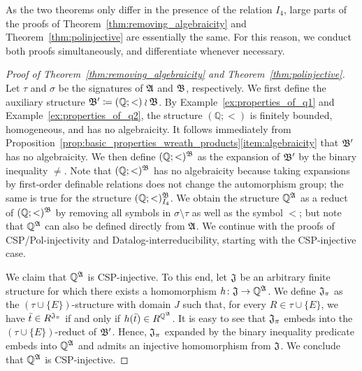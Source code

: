 \medskip 
 
As the two theorems only differ in the presence of the relation $I_4$, 
large parts of the proofs of Theorem~\ref{thm:removing_algebraicity} and Theorem~\ref{thm:polinjective} are essentially the same.
%
For this reason, we conduct both proofs simultaneously, and differentiate whenever necessary. 

\begin{proof}[Proof of Theorem~\ref{thm:removing_algebraicity} and Theorem~\ref{thm:polinjective}]     

Let $\tau$ and $\sigma$ be the signatures of $\mathfrak{A}$ and $\mathfrak{B}$, respectively.
%
We first define the auxiliary structure $\mathfrak{B}'\mathrel{\mathop:}\mathrel{\mkern-1.2mu}=  (\mathbb{Q};<) \wr \mathfrak{B}$. 
%
By Example~\ref{ex:properties_of_q1} and Example~\ref{ex:properties_of_q2}, the structure $(\mathbb{Q};<)$ is finitely bounded, homogeneous, and has no algebraicity.
%
It follows immediately from Proposition~\ref{prop:basic_properties_wreath_products}\eqref{item:algebraicity}  that $\mathfrak{B}'$ has no algebraicity.
% 
We then define $(\mathbb{Q};<)^{\mathfrak{B}}$ as the expansion of $\mathfrak{B}'$ by the binary inequality $\neq$.
%
Note that $(\mathbb{Q};<)^{\mathfrak{B}}$ has no algebraicity because taking expansions by first-order definable relations does not change the automorphism group; the same is true for the structure $(\mathbb{Q};<)^{\mathfrak{B}}_{I_4}$.
%
We obtain the structure $\mathbb{Q}^{\mathfrak{A}}$ as a reduct of $(\mathbb{Q};<)^{\mathfrak{B}}$ by removing all symbols in $\sigma\setminus \tau$ as well as the symbol $<$; but note that $\mathbb{Q}^{\mathfrak{A}}$ can also be defined directly from $\mathfrak{A}$.  
%
We continue with the proofs of CSP/Pol-injectivity and Datalog-interreducibility, starting with the CSP-injective case. 
 
We claim that $\mathbb{Q}^{\mathfrak{A}}$ is CSP-injective. 
%
To this end, let $\mathfrak{J}$ be an arbitrary finite structure for which there exists a homomorphism $h\colon \mathfrak{J} \rightarrow \mathbb{Q}^{\mathfrak{A}}$.
%
We define $\mathfrak{J}_{\pi}$ as the $(\tau \cup \{E\})$-structure with domain $J$ such that, for every $R\in \tau\cup \{E\}$, we have $\bar{t}\in R^{\mathfrak{J}_{\pi}}$ if and only if $h(\bar{t})\in R^{\mathbb{Q}^{\mathfrak{A}}}$.
% 
It is easy to see that $\mathfrak{J}_{\pi}$ embeds into the $(\tau \cup \{E\})$-reduct of $\mathfrak{B}'$.
%
Hence, $\mathfrak{J}_{\pi}$ expanded by the binary inequality predicate embeds into $\mathbb{Q}^{\mathfrak{A}}$ and admits an injective homomorphism from $\mathfrak{J}$.
%
We conclude that $\mathbb{Q}^{\mathfrak{A}}$ is CSP-injective.


\end{proof}
